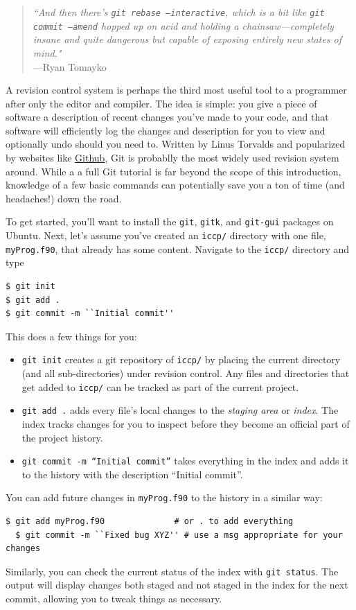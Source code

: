 \label{chap:Revision control}

\begin{quote}
\emph{``And then there's \texttt{git rebase --interactive}, which is a bit like \texttt{git commit --amend} hopped up on acid and holding a chainsaw---completely insane and quite dangerous but capable of exposing entirely new states of mind."} \\ \hspace*{\fill}---Ryan Tomayko
\end{quote}

A revision control system is perhaps the third most useful tool to a programmer after only the editor and compiler.
The idea is simple: you give a piece of software a description of recent changes you've made to your code, and that software will efficiently log the changes and description for you to view and optionally undo should you need to.
Written by Linus Torvalds and popularized by websites like \href{https://Github.com/}{Github}, Git is probablly the most widely used revision system around.
While a a full Git tutorial is far beyond the scope of this introduction, knowledge of a few basic commands can potentially save you a ton of time (and headaches!) down the road.

To get started, you'll want to install the \texttt{git}, \texttt{gitk}, and \texttt{git-gui} packages on Ubuntu. Next, let's assume you've created an \texttt{iccp/} directory with one file, \texttt{myProg.f90}, that already has some content. Navigate to the \texttt{iccp/} directory and type
\begin{verbatim}
$ git init
$ git add .
$ git commit -m ``Initial commit''
\end{verbatim}
This does a few things for you:
\begin{itemize}
  \item \texttt{git init} creates a git repository of \texttt{iccp/} by placing the current directory (and all sub-directories) under revision control.
    Any files and directories that get added to \texttt{iccp/} can be tracked as part of the current project.
  \item \texttt{git add .} adds every file's local changes to the \emph{staging area} or \emph{index}.
    The index tracks changes for you to inspect before they become an official part of the project history.
  \item \texttt{git commit -m ``Initial commit''} takes everything in the index and adds it to the history with the description ``Initial commit''.
\end{itemize}
You can add future changes in \texttt{myProg.f90} to the history in a similar way:
\begin{lstlisting}[style=prompt,nolol]
  $ git add myProg.f90              # or . to add everything
  $ git commit -m ``Fixed bug XYZ'' # use a msg appropriate for your changes
\end{lstlisting}
Similarly, you can check the current status of the index with \texttt{git status}. 
The output will display changes both staged and not staged in the index for the next commit, allowing you to tweak things as necessary.

